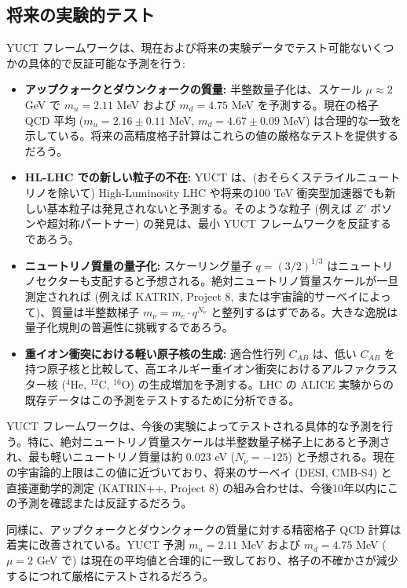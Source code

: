 \documentclass[11pt,a4paper]{article}
\theoremstyle{remark}
\begin{document}
	\subsection{将来の実験的テスト}
	
	YUCT フレームワークは、現在および将来の実験データでテスト可能ないくつかの具体的で反証可能な予測を行う:
	
	\begin{itemize}
		\item \textbf{アップクォークとダウンクォークの質量:} 半整数量子化は、スケール $\mu \approx 2$ GeV で $m_u = 2.11$ MeV および $m_d = 4.75$ MeV を予測する。現在の格子 QCD 平均 \cite{PDG2024} ($m_u = 2.16 \pm 0.11$ MeV, $m_d = 4.67 \pm 0.09$ MeV) は合理的な一致を示している。将来の高精度格子計算はこれらの値の厳格なテストを提供するだろう。
		
		\item \textbf{HL-LHC での新しい粒子の不在:} YUCT は、(おそらくステライルニュートリノを除いて) High-Luminosity LHC や将来の100 TeV 衝突型加速器でも新しい基本粒子は発見されないと予測する。そのような粒子 (例えば $Z'$ ボソンや超対称パートナー) の発見は、最小 YUCT フレームワークを反証するであろう。
		
		\item \textbf{ニュートリノ質量の量子化:} スケーリング量子 $q = (3/2)^{1/3}$ はニュートリノセクターも支配すると予想される。絶対ニュートリノ質量スケールが一旦測定されれば (例えば KATRIN, Project 8, または宇宙論的サーベイによって)、質量は半整数梯子 $m_\nu = m_e \cdot q^{N_\nu}$ と整列するはずである。大きな逸脱は量子化規則の普遍性に挑戦するであろう。
		
		\item \textbf{重イオン衝突における軽い原子核の生成:} 適合性行列 $C_{AB}$ は、低い $C_{AB}$ を持つ原子核と比較して、高エネルギー重イオン衝突におけるアルファクラスター核 ($^4$He, $^{12}$C, $^{16}$O) の生成増加を予測する。LHC の ALICE 実験からの既存データはこの予測をテストするために分析できる。
	\end{itemize}
	
	YUCT フレームワークは、今後の実験によってテストされる具体的な予測を行う。特に、絶対ニュートリノ質量スケールは半整数量子梯子上にあると予測され、最も軽いニュートリノ質量は約 $0.023$ eV ($N_\nu = -125$) と予想される。現在の宇宙論的上限はこの値に近づいており、将来のサーベイ (DESI, CMB‑S4) と直接運動学的測定 (KATRIN++, Project 8) の組み合わせは、今後10年以内にこの予測を確認または反証するだろう。
	
	同様に、アップクォークとダウンクォークの質量に対する精密格子 QCD 計算は着実に改善されている。YUCT 予測 $m_u = 2.11$ MeV および $m_d = 4.75$ MeV ($\mu = 2$ GeV で) は現在の平均値と合理的に一致しており、格子の不確かさが減少するにつれて厳格にテストされるだろう。
	
\end{document}
